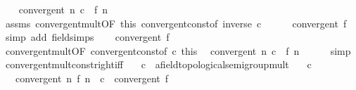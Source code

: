 \begin{isabellebody}
%
\isadelimproof
%
\endisadelimproof
%
\isatagproof
{}\isamarkupfalse%
\isanewline
\ \ \isamarkupfalse%
\ {\isachardoublequoteopen}convergent\ {\isacharparenleft}{\kern0pt}{\isasymlambda}n{\isachardot}{\kern0pt}\ c\ {\isacharasterisk}{\kern0pt}\ f\ n{\isacharparenright}{\kern0pt}{\isachardoublequoteclose}\isanewline
\ \ \isamarkupfalse%
\ assms\ convergent{\isacharunderscore}{\kern0pt}mult{\isacharbrackleft}{\kern0pt}OF\ this\ convergent{\isacharunderscore}{\kern0pt}const{\isacharbrackleft}{\kern0pt}of\ {\isachardoublequoteopen}inverse\ c{\isachardoublequoteclose}{\isacharbrackright}{\kern0pt}{\isacharbrackright}{\kern0pt}\isanewline
\ \ \ \ \isamarkupfalse%
\ {\isachardoublequoteopen}convergent\ f{\isachardoublequoteclose}\ \isamarkupfalse%
\ {\isacharparenleft}{\kern0pt}simp\ add{\isacharcolon}{\kern0pt}\ field{\isacharunderscore}{\kern0pt}simps{\isacharparenright}{\kern0pt}\isanewline
{}\isamarkupfalse%
\isanewline
\ \ \isamarkupfalse%
\ {\isachardoublequoteopen}convergent\ f{\isachardoublequoteclose}\isanewline
\ \ \isamarkupfalse%
\ convergent{\isacharunderscore}{\kern0pt}mult{\isacharbrackleft}{\kern0pt}OF\ convergent{\isacharunderscore}{\kern0pt}const{\isacharbrackleft}{\kern0pt}of\ c{\isacharbrackright}{\kern0pt}\ this{\isacharbrackright}{\kern0pt}\ \isamarkupfalse%
\ {\isachardoublequoteopen}convergent\ {\isacharparenleft}{\kern0pt}{\isasymlambda}n{\isachardot}{\kern0pt}\ c\ {\isacharasterisk}{\kern0pt}\ f\ n{\isacharparenright}{\kern0pt}{\isachardoublequoteclose}\isanewline
\ \ \ \ \isamarkupfalse%
\ simp\isanewline
{}\isamarkupfalse%
%
\endisatagproof
{\isafoldproof}%
%
\isadelimproof
\isanewline
%
\endisadelimproof
\isanewline
{}\isamarkupfalse%
\ convergent{\isacharunderscore}{\kern0pt}mult{\isacharunderscore}{\kern0pt}const{\isacharunderscore}{\kern0pt}right{\isacharunderscore}{\kern0pt}iff{\isacharcolon}{\kern0pt}\isanewline
\ \ \ c\ {\isacharcolon}{\kern0pt}{\isacharcolon}{\kern0pt}\ {\isachardoublequoteopen}{\isacharprime}{\kern0pt}a{\isacharcolon}{\kern0pt}{\isacharcolon}{\kern0pt}{\isacharbraceleft}{\kern0pt}field{\isacharcomma}{\kern0pt}topological{\isacharunderscore}{\kern0pt}semigroup{\isacharunderscore}{\kern0pt}mult{\isacharbraceright}{\kern0pt}{\isachardoublequoteclose}\isanewline
\ \ \ {\isachardoublequoteopen}c\ {\isasymnoteq}\ {}{\isachardoublequoteclose}\isanewline
\ \ \ {\isachardoublequoteopen}convergent\ {\isacharparenleft}{\kern0pt}{\isasymlambda}n{\isachardot}{\kern0pt}\ f\ n\ {\isacharasterisk}{\kern0pt}\ c{\isacharparenright}{\kern0pt}\ {\isasymlongleftrightarrow}\ convergent\ f{\isachardoublequoteclose}\isanewline

\end{isabellebody}
